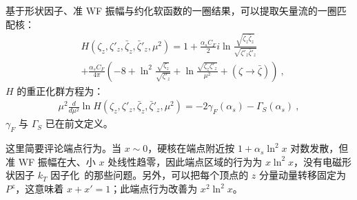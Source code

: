 基于形状因子、准 WF 振幅与约化软函数的一圈结果，可以提取矢量流的一圈匹配核：
\begin{align}
	&H(\zeta_z,\zeta'_z,\bar \zeta_z,\bar \zeta'_z,\mu^2)=1+ \frac{\alpha_sC_F}{2}i\ln \frac{\sqrt{\zeta_z\bar\zeta_z}}{\sqrt{\zeta'_z\bar\zeta'_z}}  \\
	&+\frac{\alpha_sC_F}{4\pi}\left(-8+\ln^2\frac{\sqrt{\zeta_z}}{\sqrt{\zeta'_z}}+\ln \frac{\sqrt{\zeta_z\zeta'_z}}{\mu^2}+(\zeta \rightarrow \bar \zeta)\right)\nonumber \ ,
\end{align}
$H$ 的重正化群方程为：
\begin{align}
	\mu^2\frac{d}{d\mu^2}\ln H(\zeta_z,\zeta'_z,\bar \zeta_z,\bar \zeta'_z,\mu^2)=-2\gamma_F(\alpha_s)-\Gamma_{S}(\alpha_s) \ ,
\end{align}
$\gamma_F$ 与 $\Gamma_S$ 已在前文定义。

这里简要评论端点行为。当 $x\sim 0$，硬核在端点附近按 $ 1+\alpha_s \ln^2 x$ 对数发散，但准 WF 振幅在大、小 $x$ 处线性趋零，因此端点区域的行为为 $x\ln^2 x$，没有电磁形状因子 $k_T$ 因子化~\cite{Li:1992nu}的那些问题。另外，可以把每个顶点的 $z$ 分量动量转移固定为 $P^z$，这意味着 $x+x'=1$；此端点行为改善为 $x^2\ln^2 x$。

